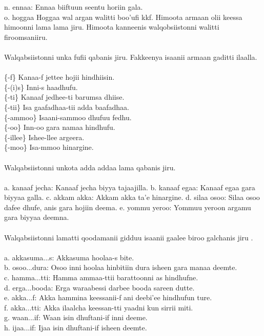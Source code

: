 \documentclass[11pt,b5paper]{book}
\begin{document}
n. ennaa: Ennaa biiftuun seentu horiin gala.\\
o. hoggaa Hoggaa wal argan walitti boo’ufi kkf. Himoota armaan olii keessa himoonni lama lama jiru. Himoota
kanneenis walqobsiistonni walitti firoomsaniiru.\\
\\
Walqabsiistonni unka fufii qabanis jiru. Fakkeenya isaanii armaan gaditti ilaalla. \\
\\
\{-f\} Kanaa-f jettee hojii hindhiisin.\\
\{-(i)s\} Inni-s haadhufu.\\
\{-ti\} Kanaaf jedhee-ti barumsa dhiise.\\
\{-tii\} Isa gaafadhaa-tii adda baafadhaa.\\
\{-ammoo\} Isaani-sammoo dhufuu fedhu.\\
\{-oo\} Inn-oo gara namaa hindhufu.\\
\{-illee\} Ishee-llee argeera.\\
\{-moo\} Isa-mmoo hinargine.\\
\\
Walqabsiistonni unkota adda addaa lama qabanis jiru.\\
\\
a. kanaaf jecha: Kanaaf jecha biyya tajaajilla.
b. kanaaf egaa: Kanaaf egaa gara biyyaa galla.
c. akkam akka: Akkam akka ta’e hinargine.
d. silaa osoo: Silaa osoo dafee dhufe, anis gara hojiin
deema.
e. yommu yeroo: Yommuu yeroon argamu gara biyyaa
deemna.\\
\\
Walqabsiistonni lamatti qoodamanii gidduu isaanii gaalee biroo galchanis jiru \cite[60]{griefenow2001grammatical}.\\
\\
a. akkasuma...s: Akkasuma hoolaa-s bite.\\
b. osoo...dura: Osoo inni hoolaa hinbitiin dura isheen gara manaa deemte.\\
c. hamma...tti: Hamma ammaa-ttii barattoonni as hindhufne.\\
d. erga...booda: Erga waraabessi darbee booda sareen dutte.\\
e. akka...f: Akka hammina keessanii-f ani deebi’ee hindhufun ture.\\
f. akka...tti: Akka ilaalcha keessan-tti yaadni kun sirrii miti.\\
g. waan...if: Waan isin dhuftani-if inni deeme.\\
h. ijaa...if: Ijaa isin dhuftani-if isheen deemte.\\
\end{document}
